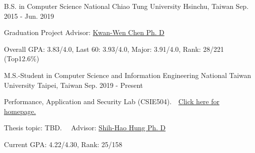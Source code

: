 

\begin{cventries}

\cventry
    {B.S. in Computer Science} %
    {National Chiao Tung University} %
    {Hsinchu, Taiwan} %
    {Sep. 2015 - Jun. 2019} %
    {
      \begin{cvitems} %
        \item {Graduation Project Advisor: \href{https://www.cs.nctu.edu.tw/members/detail/kuanwen}{Kwan-Wen Chen Ph. D}}
        \item {Overall GPA: 3.83/4.0, Last 60: 3.93/4.0, Major: 3.91/4.0, Rank: 28/221 (Top12.6\%)}
      \end{cvitems}
    }
    
\cventry
    {M.S.-Student in Computer Science and Information Engineering} %
    {National Taiwan University} %
    {Taipei, Taiwan} %
    {Sep. 2019 - Present} %
    {
      \begin{cvitems} %
        \item Performance, Application and Security Lab (CSIE504).\ \    \href{https://hungsh-ntucsie.blogspot.com/p/blog-page_2668.html}{Click here for homepage.}
        \item Thesis topic: TBD. \ \ Advisor: \href{https://www.csie.ntu.edu.tw/~hungsh/}{Shih-Hao Hung Ph. D}
        \item {Current GPA: 4.22/4.30, Rank: 25/158}
      \end{cvitems}
    }
\end{cventries}
